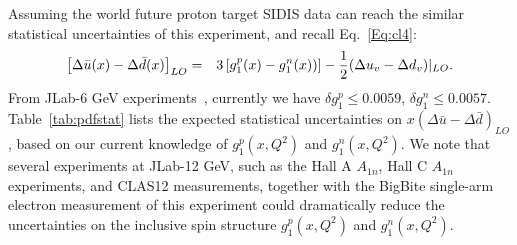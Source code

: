Assuming the world future proton target SIDIS data can reach the similar statistical uncertainties of this experiment,  and recall Eq.~\ref{Eq:cl4}:
\begin{eqnarray}
\left[\Delta \bar{u}(x) - \Delta \bar{d}(x) \right]_{LO} & = & 3 \left[ g_1^p(x)- g_1^n(x)) \right] 
 - {1 \over 2} (\Delta u_v - \Delta d_v) \vert_{LO}. \nonumber 
\end{eqnarray}
From JLab-6 GeV experiments~\cite{lit:bbfit,xiaochao}, currently  we have $\delta g_1^p \le 0.0059$, $\delta g_1^n \le 0.0057$.
Table~\ref{tab:pdfstat} lists the expected statistical uncertainties on $x(\Delta \bar{u}-\Delta \bar{d})_{LO}$, based on our current knowledge of $g_1^p(x, Q^2)$ and $g_1^n(x, Q^2)$.  We note that several  experiments at JLab-12 GeV,   such as the Hall A $A_{1n}$, Hall C $A_{1n}$  experiments, and CLAS12 measurements,  together with the BigBite single-arm electron measurement  of this experiment could dramatically reduce the uncertainties on the  inclusive spin structure  $g_1^p(x, Q^2)$ and $g_1^n(x, Q^2)$.
